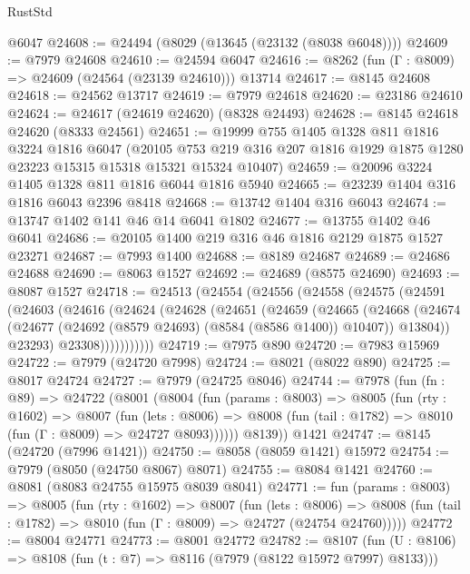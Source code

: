 \begin{lexlean}{RustStd}
\begin{coremodule}
    @6047
@24608 := @24494 (@8029 (@13645 (@23132 (@8038 @6048))))
@24609 := @7979 @24608
@24610 := @24594 @6047
@24616 := @8262 (fun (Γ : @8009) => @24609 (@24564 (@23139 @24610))) @13714
@24617 := @8145 @24608
@24618 := @24562 @13717
@24619 := @7979 @24618
@24620 := @23186 @24610
@24624 := @24617 (@24619 @24620) (@8328 @24493)
@24628 := @8145 @24618 @24620 (@8333 @24561)
@24651 := @19999
    @755
    @1405
    @1328
    @811
    @1816
    @3224
    @1816
    @6047
    (@20105 @753 @219 @316 @207 @1816 @1929 @1875 @1280 @23223 @15315 @15318 @15321 @15324 @10407)
@24659 := @20096 @3224 @1405 @1328 @811 @1816 @6044 @1816 @5940
@24665 := @23239 @1404 @316 @1816 @6043 @2396 @8418
@24668 := @13742 @1404 @316 @6043
@24674 := @13747 @1402 @141 @46 @14 @6041 @1802
@24677 := @13755 @1402 @46 @6041
@24686 := @20105 @1400 @219 @316 @46 @1816 @2129 @1875 @1527 @23271
@24687 := @7993 @1400
@24688 := @8189 @24687
@24689 := @24686 @24688
@24690 := @8063 @1527
@24692 := @24689 (@8575 @24690)
@24693 := @8087 @1527
@24718 := @24513
    (@24554
      (@24556
        (@24558
          (@24575
            (@24591
              (@24603
                (@24616
                  (@24624
                    (@24628
                      (@24651
                        (@24659
                          (@24665
                            (@24668
                              (@24674
                                (@24677 (@24692 (@8579 @24693) (@8584 (@8586 @1400)) @10407))
                                @13804))
                            @23293)
                          @23308)))))))))))
@24719 := @7975 @890
@24720 := @7983 @15969
@24722 := @7979 (@24720 @7998)
@24724 := @8021 (@8022 @890)
@24725 := @8017 @24724
@24727 := @7979 (@24725 @8046)
@24744 := @7978
    (fun (fn : @89) =>
    @24722
      (@8001
        (@8004
          (fun (params : @8003) =>
          @8005
            (fun (rty : @1602) =>
            @8007
              (fun (lets : @8006) =>
              @8008 (fun (tail : @1782) => @8010 (fun (Γ : @8009) => @24727 @8093))))))
        @8139))
    @1421
@24747 := @8145 (@24720 (@7996 @1421))
@24750 := @8058 (@8059 @1421) @15972
@24754 := @7979 (@8050 (@24750 @8067) @8071)
@24755 := @8084 @1421
@24760 := @8081 (@8083 @24755 @15975 @8039 @8041)
@24771 := fun (params : @8003) =>
  @8005
    (fun (rty : @1602) =>
    @8007
      (fun (lets : @8006) =>
      @8008 (fun (tail : @1782) => @8010 (fun (Γ : @8009) => @24727 (@24754 @24760)))))
@24772 := @8004 @24771
@24773 := @8001 @24772
@24782 := @8107
    (fun (U : @8106) => @8108 (fun (t : @7) => @8116 (@7979 (@8122 @15972 @7997) @8133)))

\end{coremodule}
\end{lexlean}
